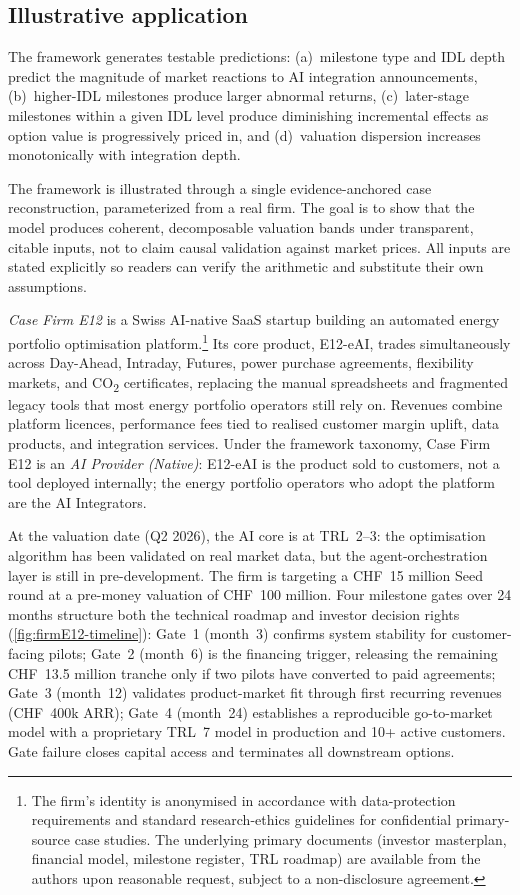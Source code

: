 \documentclass[oneside,10pt]{swissi}
\begin{document}
\subsection{Illustrative application}
\label{sec:empirical}

The framework generates testable predictions: (a)~milestone type and IDL depth predict the magnitude of market reactions to AI integration announcements, (b)~higher-IDL milestones produce larger abnormal returns, (c)~later-stage milestones within a given IDL level produce diminishing incremental effects as option value is progressively priced in, and (d)~valuation dispersion increases monotonically with integration depth.

The framework is illustrated through a single evidence-anchored case reconstruction, parameterized from a real firm. The goal is to show that the model produces coherent, decomposable valuation bands under transparent, citable inputs, not to claim causal validation against market prices. All inputs are stated explicitly so readers can verify the arithmetic and substitute their own assumptions.
\label{sec:case-study}

\emph{Case Firm E12} is a Swiss AI-native SaaS startup building an automated energy portfolio optimisation platform.\footnote{The firm's identity is anonymised in accordance with data-protection requirements and standard research-ethics guidelines for confidential primary-source case studies. The underlying primary documents (investor masterplan, financial model, milestone register, TRL roadmap) are available from the authors upon reasonable request, subject to a non-disclosure agreement.} Its core product, E12-eAI, trades simultaneously across Day-Ahead, Intraday, Futures, power purchase agreements, flexibility markets, and CO\textsubscript{2} certificates, replacing the manual spreadsheets and fragmented legacy tools that most energy portfolio operators still rely on. Revenues combine platform licences, performance fees tied to realised customer margin uplift, data products, and integration services. Under the framework taxonomy, Case Firm E12 is an \emph{AI Provider (Native)}: E12-eAI is the product sold to customers, not a tool deployed internally; the energy portfolio operators who adopt the platform are the AI Integrators.

At the valuation date (Q2 2026), the AI core is at TRL~2--3: the optimisation algorithm has been validated on real market data, but the agent-orchestration layer is still in pre-development. The firm is targeting a CHF~15 million Seed round at a pre-money valuation of CHF~100 million. Four milestone gates over 24 months structure both the technical roadmap and investor decision rights (\cref{fig:firmE12-timeline}): Gate~1 (month~3) confirms system stability for customer-facing pilots; Gate~2 (month~6) is the financing trigger, releasing the remaining CHF~13.5 million tranche only if two pilots have converted to paid agreements; Gate~3 (month~12) validates product-market fit through first recurring revenues (CHF~400k ARR); Gate~4 (month~24) establishes a reproducible go-to-market model with a proprietary TRL~7 model in production and 10+ active customers. Gate failure closes capital access and terminates all downstream options.
\end{document}
